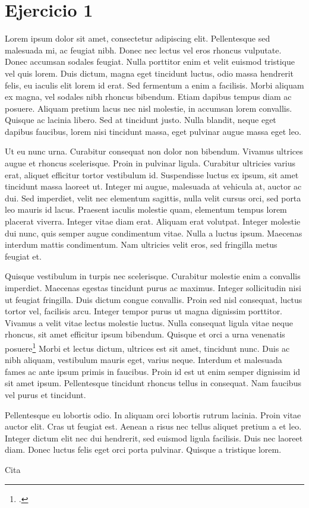 \section*{Ejercicio 1}
Lorem ipsum dolor sit amet, consectetur adipiscing elit. Pellentesque sed malesuada mi, ac feugiat nibh. Donec nec lectus vel eros rhoncus vulputate. Donec accumsan sodales feugiat. Nulla porttitor enim et velit euismod tristique vel quis lorem. Duis dictum, magna eget tincidunt luctus, odio massa hendrerit felis, eu iaculis elit lorem id erat. Sed fermentum a enim a facilisis. Morbi aliquam ex magna, vel sodales nibh rhoncus bibendum. Etiam dapibus tempus diam ac posuere. Aliquam pretium lacus nec nisl molestie, in accumsan lorem convallis. Quisque ac lacinia libero. Sed at tincidunt justo. Nulla blandit, neque eget dapibus faucibus, lorem nisi tincidunt massa, eget pulvinar augue massa eget leo.\par
Ut eu nunc urna. Curabitur consequat non dolor non bibendum. Vivamus ultrices augue et rhoncus scelerisque. Proin in pulvinar ligula. Curabitur ultricies varius erat, aliquet efficitur tortor vestibulum id. Suspendisse luctus ex ipsum, sit amet tincidunt massa laoreet ut. Integer mi augue, malesuada at vehicula at, auctor ac dui. Sed imperdiet, velit nec elementum sagittis, nulla velit cursus orci, sed porta leo mauris id lacus. Praesent iaculis molestie quam, elementum tempus lorem placerat viverra. Integer vitae diam erat. Aliquam erat volutpat. Integer molestie dui nunc, quis semper augue condimentum vitae. Nulla a luctus ipsum. Maecenas interdum mattis condimentum. Nam ultricies velit eros, sed fringilla metus feugiat et.\par
Quisque vestibulum in turpis nec scelerisque. Curabitur molestie enim a convallis imperdiet. Maecenas egestas tincidunt purus ac maximus. Integer sollicitudin nisi ut feugiat fringilla. Duis dictum congue convallis. Proin sed nisl consequat, luctus tortor vel, facilisis arcu. Integer tempor purus ut magna dignissim porttitor. Vivamus a velit vitae lectus molestie luctus. Nulla consequat ligula vitae neque rhoncus, sit amet efficitur ipsum bibendum. Quisque et orci a urna venenatis posuere\footcite{knuth-fa} Morbi et lectus dictum, ultrices est sit amet, tincidunt nunc. Duis ac nibh aliquam, vestibulum mauris eget, varius neque. Interdum et malesuada fames ac ante ipsum primis in faucibus. Proin id est ut enim semper dignissim id sit amet ipsum. Pellentesque tincidunt rhoncus tellus in consequat. Nam faucibus vel purus et tincidunt.\par
Pellentesque eu lobortis odio. In aliquam orci lobortis rutrum lacinia. Proin vitae auctor elit. Cras ut feugiat est. Aenean a risus nec tellus aliquet pretium a et leo. Integer dictum elit nec dui hendrerit, sed euismod ligula facilisis. Duis nec laoreet diam. Donec luctus felis eget orci porta pulvinar. Quisque a tristique lorem.\par
Cita \cite[p.550]{einstein}
\begin{figure}[!ht]
    \centering
    
\end{figure}